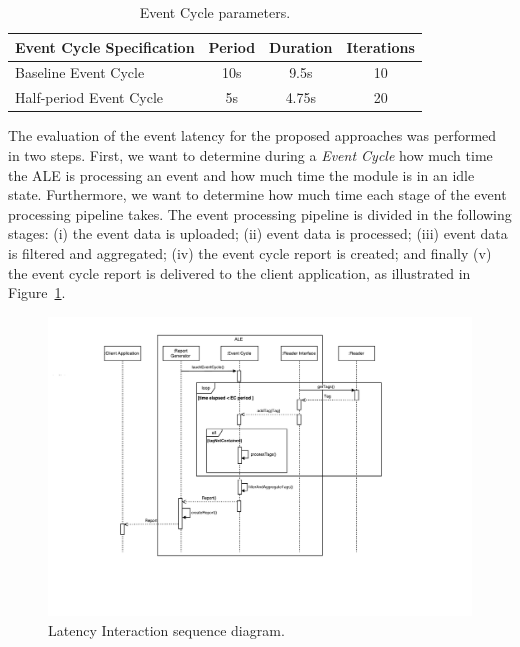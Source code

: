 \begin{table}[ht!]
  \begin{tabular}{|l|c|c|c|}
    \hline
    Event Cycle Specification & Period  & Duration & Iterations \\ \hline
    Baseline Event Cycle      &  10s    & 9.5s     & 10          \\ \hline
    Half-period Event Cycle   &   5s    & 4.75s    & 20          \\ \hline
  \end{tabular}
  \caption[Event Cycle parameters.]{Event Cycle parameters.}
  \label{table:ecspec_parameters}
\end{table}

The evaluation of the event latency for the proposed approaches was performed in two steps. First,
we want to determine during a \textit{Event Cycle} how much time the \gls{ALE} is processing an event
and how much time the module is in an idle state. Furthermore, we want to determine how much time
each stage of the event processing pipeline takes. The event processing pipeline is divided in the
following stages: (i) the event data is uploaded; (ii) event data is processed; (iii) event data is
filtered and aggregated; (iv) the event cycle report is created; and finally (v) the event cycle report
is delivered to the client application, as illustrated in Figure~\ref{fig:latency_seq_diagram}.

\begin{figure}[ht!]
  \centering
  \includegraphics[width=\textwidth]{./images/latency_interaction_seq_diagram}
  \caption[Latency Interaction sequence diagram.]{Latency Interaction sequence diagram.}
  \label{fig:latency_seq_diagram}
\end{figure}

